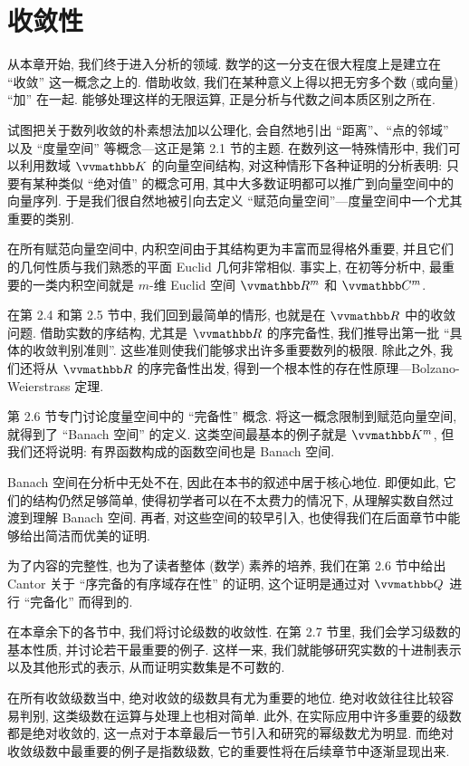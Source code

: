 \chapter{收敛性}

从本章开始, 我们终于进入分析的领域. 数学的这一分支在很大程度上是建立在 ``收敛'' 这一概念之上的. 借助收敛, 我们在某种意义上得以把无穷多个数 (或向量) ``加'' 在一起. 能够处理这样的无限运算, 正是分析与代数之间本质区别之所在.

试图把关于数列收敛的朴素想法加以公理化, 会自然地引出 ``距离''、``点的邻域'' 以及 ``度量空间'' 等概念---这正是第 2.1 节的主题. 在数列这一特殊情形中, 我们可以利用数域 \(\K\) 的向量空间结构, 对这种情形下各种证明的分析表明: 只要有某种类似 ``绝对值'' 的概念可用, 其中大多数证明都可以推广到向量空间中的向量序列. 于是我们很自然地被引向去定义 ``赋范向量空间''---度量空间中一个尤其重要的类别.

在所有赋范向量空间中, 内积空间由于其结构更为丰富而显得格外重要, 并且它们的几何性质与我们熟悉的平面 Euclid 几何非常相似. 事实上, 在初等分析中, 最重要的一类内积空间就是 \(m\)-维 Euclid 空间 \(\R^m\) 和 \(\C^m\).

在第 2.4 和第 2.5 节中, 我们回到最简单的情形, 也就是在 \(\R\) 中的收敛问题. 借助实数的序结构, 尤其是 \(\R\) 的序完备性, 我们推导出第一批 ``具体的收敛判别准则''. 这些准则使我们能够求出许多重要数列的极限. 除此之外, 我们还将从 \(\R\) 的序完备性出发, 得到一个根本性的存在性原理---Bolzano-Weierstrass 定理.

第 2.6 节专门讨论度量空间中的 ``完备性'' 概念. 将这一概念限制到赋范向量空间, 就得到了 ``Banach 空间'' 的定义. 这类空间最基本的例子就是 \(\K^m\), 但我们还将说明: 有界函数构成的函数空间也是 Banach 空间.

Banach 空间在分析中无处不在, 因此在本书的叙述中居于核心地位. 即便如此, 它们的结构仍然足够简单, 使得初学者可以在不太费力的情况下, 从理解实数自然过渡到理解 Banach 空间. 再者, 对这些空间的较早引入, 也使得我们在后面章节中能够给出简洁而优美的证明.

为了内容的完整性, 也为了读者整体 (数学) 素养的培养, 我们在第 2.6 节中给出 Cantor 关于 ``序完备的有序域存在性'' 的证明, 这个证明是通过对 \(\Q\) 进行 ``完备化'' 而得到的.

在本章余下的各节中, 我们将讨论级数的收敛性. 在第 2.7 节里, 我们会学习级数的基本性质, 并讨论若干最重要的例子. 这样一来, 我们就能够研究实数的十进制表示以及其他形式的表示, 从而证明实数集是不可数的.

在所有收敛级数当中, 绝对收敛的级数具有尤为重要的地位. 绝对收敛往往比较容易判别, 这类级数在运算与处理上也相对简单. 此外, 在实际应用中许多重要的级数都是绝对收敛的, 这一点对于本章最后一节引入和研究的幂级数尤为明显. 而绝对收敛级数中最重要的例子是指数级数, 它的重要性将在后续章节中逐渐显现出来.

